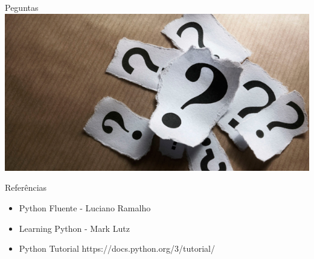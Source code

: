 \begin{frame}{Peguntas}
	\includegraphics[scale=0.5]{img/perguntas.jpg}
\end{frame} 
 
\begin{frame}{Referências}
 	\begin{itemize}
 		\item Python Fluente - Luciano Ramalho
 		\item Learning Python - Mark Lutz
 		\item Python Tutorial https://docs.python.org/3/tutorial/
 	\end{itemize}
\end{frame} 
